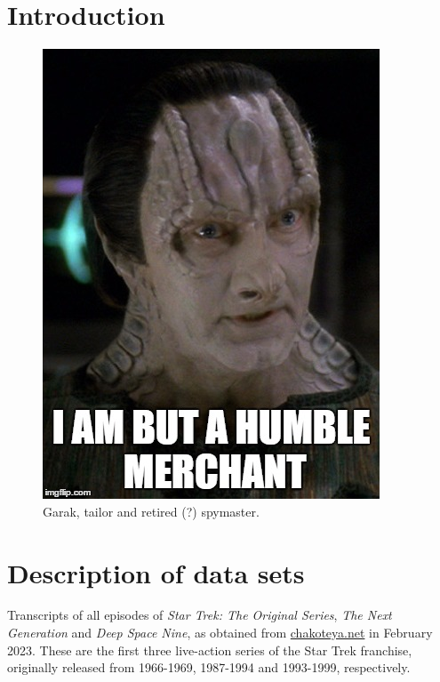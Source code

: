 


\section{Introduction}
\label{sec:papertag.introduction}

\begin{figure}[tp!]
  \centering
    \includegraphics[width=0.5\columnwidth]{figures/localized/Garak.jpg}
  \caption{
    Garak, tailor and retired (?) spymaster.
  }
  \label{fig:papertag.}
\end{figure}

\section{Description of data sets}
\label{sec:papertag.data}

Transcripts of all episodes of \textit{Star Trek: The Original Series}, \textit{The Next Generation} and \textit{Deep Space Nine}, as obtained from \href{http://chakoteya.net/StarTrek/index.html}{chakoteya.net} in February 2023. These are the first three live-action series of the Star Trek franchise, originally released from 1966-1969, 1987-1994 and 1993-1999, respectively.

